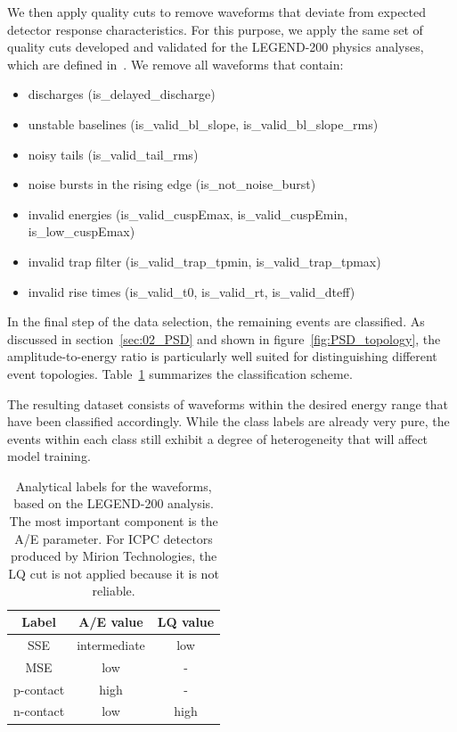 We then apply quality cuts to remove waveforms that deviate from expected detector response characteristics. For this purpose, we apply the same set of quality cuts developed and validated for the LEGEND-200 physics analyses, which are defined in~\cite{lnote_24011}. We remove all waveforms that contain:

\begin{itemize}
    \item discharges (is\_delayed\_discharge)
    \item unstable baselines (is\_valid\_bl\_slope, is\_valid\_bl\_slope\_rms)
    \item noisy tails (is\_valid\_tail\_rms)
    \item noise bursts in the rising edge (is\_not\_noise\_burst)
    \item invalid energies (is\_valid\_cuspEmax, is\_valid\_cuspEmin, is\_low\_cuspEmax)
    \item invalid trap filter (is\_valid\_trap\_tpmin, is\_valid\_trap\_tpmax)
    \item invalid rise times (is\_valid\_t0, is\_valid\_rt, is\_valid\_dteff)
\end{itemize}

In the final step of the data selection, the remaining events are classified.
As discussed in section~\ref{sec:02_PSD} and shown in figure~\ref{fig:PSD_topology}, the amplitude-to-energy ratio is particularly well suited for distinguishing different event topologies. Table~\ref{tab:event_classification} summarizes the classification scheme. 

The resulting dataset consists of waveforms within the desired energy range that have been classified accordingly. While the class labels are already very pure, the events within each class still exhibit a degree of heterogeneity that will affect model training. 

\begin{table}
\centering
\caption{Analytical labels for the waveforms, based on the LEGEND-200 analysis. The most important component is the A/E parameter. For ICPC detectors produced by Mirion Technologies, the LQ cut is not applied because it is not reliable.} 
\begin{tabular}{||c | c | c||} 
 \hline
 \textbf{Label} & \textbf{A/E value} & \textbf{LQ value} \\ 
 \hline
 SSE & intermediate & low \\ 
 \hline
 MSE & low & - \\ 
 \hline
 p-contact & high & - \\ 
 \hline
 n-contact & low & high \\ 
 \hline
\end{tabular}
\label{tab:event_classification}
\end{table}

